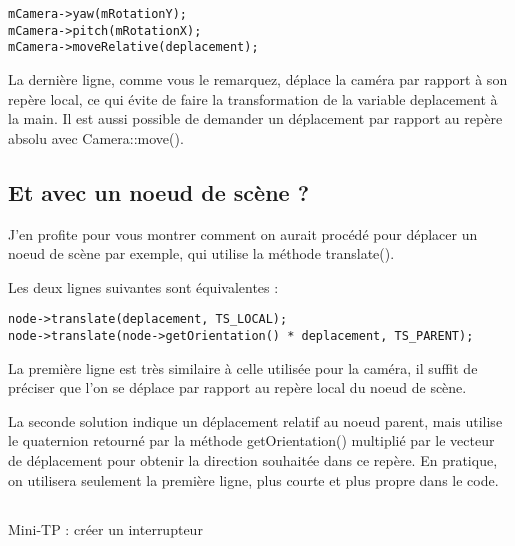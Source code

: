 \begin{lstlisting}[caption={}]
mCamera->yaw(mRotationY);
mCamera->pitch(mRotationX);
mCamera->moveRelative(deplacement);
\end{lstlisting}

La dernière ligne, comme vous le remarquez, déplace la caméra par rapport à son repère local, ce qui évite de faire la transformation de la variable deplacement à la main. Il est aussi possible de demander un déplacement par rapport au repère absolu avec Camera::move().


















\subsection{Et avec un noeud de scène ?}

J'en profite pour vous montrer comment on aurait procédé pour déplacer un noeud de scène par exemple, qui utilise la méthode translate().

Les deux lignes suivantes sont équivalentes :


\begin{lstlisting}[caption={}]
node->translate(deplacement, TS_LOCAL);
node->translate(node->getOrientation() * deplacement, TS_PARENT);
\end{lstlisting}


La première ligne est très similaire à celle utilisée pour la caméra, il suffit de préciser que l'on se déplace par rapport au repère local du noeud de scène.

La seconde solution indique un déplacement relatif au noeud parent, mais utilise le quaternion retourné par la méthode getOrientation() multiplié par le vecteur de déplacement pour obtenir la direction souhaitée dans ce repère. En pratique, on utilisera seulement la première ligne, plus courte et plus propre dans le code.







\subsection{}
Mini-TP : créer un interrupteur

